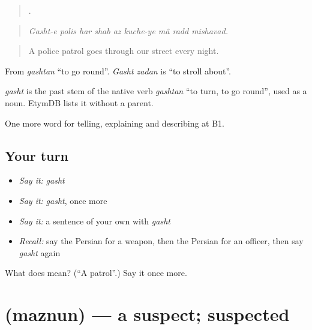 \begin{quote}
        .
\end{quote}

\begin{quote}
\emph{Gasht-e polis har shab az kuche-ye mâ radd mishavad.}
\end{quote}

\begin{quote}
A police patrol goes through our street every night.
\end{quote}

From \emph{gashtan} \textquotedblleft{}to go round\textquotedblright{}. \emph{Gasht zadan} is \textquotedblleft{}to stroll about\textquotedblright{}.

\begin{cousinweb}
\emph{gasht} is the past stem of the native verb \emph{gashtan} \textquotedblleft{}to turn, to go round\textquotedblright{}, used as a noun. EtymDB lists it without a parent.
\end{cousinweb}

\begin{grammarlens}[title={What you've built}]
One more word for telling, explaining and describing at B1.
\end{grammarlens}

\subsection*{Your turn}
\begin{itemize}
\raggedright
  \item \emph{Say it:} \emph{gasht}
  \item \emph{Say it:} \emph{gasht}, once more
  \item \emph{Say it:} a sentence of your own with \emph{gasht}
  \item \emph{Recall:} say the Persian for a weapon, then the Persian for an officer, then say \emph{gasht} again
\end{itemize}

\begin{tcolorbox}[breakable,colback=teal!4,colframe=teal!35!black,title={Before you move on}]
What does  mean? (\textquotedblleft{}A patrol\textquotedblright{}.) Say it once more.
\end{tcolorbox}
\section[\texorpdfstring{\fa{مظنون} (maznun)}{مظنون (maznun)}]{ (maznun) — a suspect; suspected}

